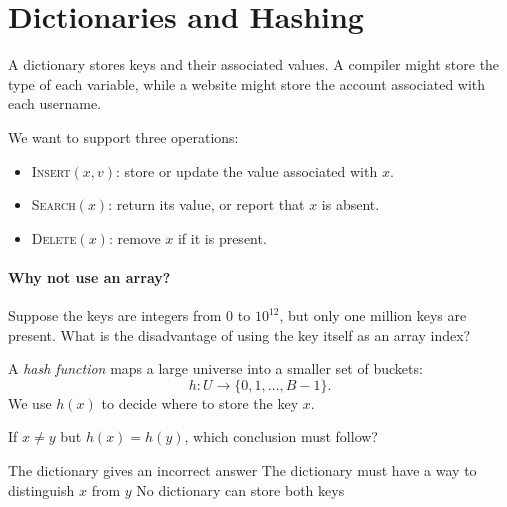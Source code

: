 \documentclass[11pt]{article}
\begin{document}


\section{Dictionaries and Hashing}
A dictionary stores keys and their associated values. A compiler might store
the type of each variable, while a website might store the account associated
with each username.

We want to support three operations:
\begin{itemize}
    \item \textsc{Insert}$(x,v)$: store or update the value associated with $x$.
    \item \textsc{Search}$(x)$: return its value, or report that $x$ is absent.
    \item \textsc{Delete}$(x)$: remove $x$ if it is present.
\end{itemize}

\paragraph{Why not use an array?}
Suppose the keys are integers from $0$ to $10^{12}$, but only one million keys
are present. What is the disadvantage of using the key itself as an array index?
\vs{1cm}

A \emph{hash function} maps a large universe into a smaller set of buckets:
\begin{equation*}
    h:U\longrightarrow\{0,1,\ldots,B-1\}.
\end{equation*}
We use $h(x)$ to decide where to store the key $x$.

\begin{Qu}
    If $x\neq y$ but $h(x)=h(y)$, which conclusion must follow?
    \begin{itemize}
        \aitem The dictionary gives an incorrect answer
        \bitem The dictionary must have a way to distinguish $x$ from $y$
        \citem No dictionary can store both keys
    \end{itemize}
\end{Qu}
\end{document}
